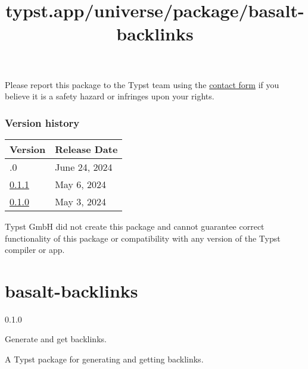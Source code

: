 Please report this package to the Typst team using the
\href{https://typst.app/contact}{contact form} if you believe it is a
safety hazard or infringes upon your rights.

\label{versions}
\subsubsection{Version history}\label{version-history}

\begin{longtable}[]{@{}ll@{}}
\toprule\noalign{}
Version & Release Date \\
\midrule\noalign{}
\endhead
\bottomrule\noalign{}
\endlastfoot
0.2.0 & June 24, 2024 \\
\href{https://typst.app/universe/package/numblex/0.1.1/}{0.1.1} & May 6,
2024 \\
\href{https://typst.app/universe/package/numblex/0.1.0/}{0.1.0} & May 3,
2024 \\
\end{longtable}

Typst GmbH did not create this package and cannot guarantee correct
functionality of this package or compatibility with any version of the
Typst compiler or app.


\title{typst.app/universe/package/basalt-backlinks}

\label{banner}
\section{basalt-backlinks}\label{basalt-backlinks}

{ 0.1.0 }

Generate and get backlinks.

\label{readme}
A Typst package for generating and getting backlinks.

\begin{Shaded}
\begin{Highlighting}[]
\end{Highlighting}
\end{Shaded}

